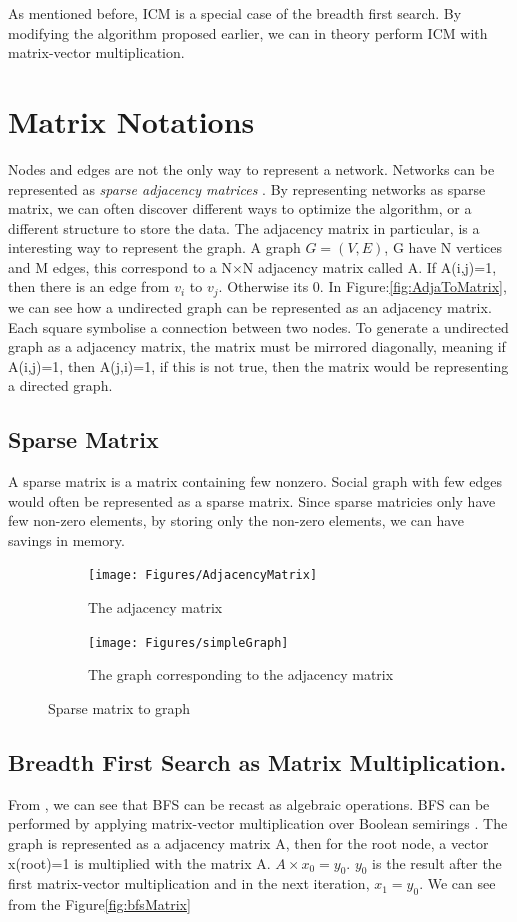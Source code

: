 As mentioned before, ICM is a special case of the breadth first search. By modifying the algorithm proposed earlier, we can in theory perform ICM with matrix-vector multiplication.  

\section{Matrix Notations}
Nodes and edges are not the only way to represent a network. Networks can be represented as \textit{sparse adjacency matrices} \cite{AlgoToMath} \cite{McAndrew1963}. By representing networks as sparse matrix, we can often discover different ways to optimize the algorithm, or a different structure to store the data. The adjacency matrix in particular, is a interesting way to represent the graph. A graph $G =(V,E)$, G have N vertices and M edges, this correspond to a N$\times$N adjacency matrix called A. If A(i,j)=1, then there is an edge from $v_i$ to $v_j$. Otherwise its 0. In Figure:\ref{fig:AdjaToMatrix}, we can see how a undirected graph can be represented as an adjacency matrix. Each square symbolise a connection between two nodes. To generate a undirected graph as a adjacency matrix, the matrix must be mirrored diagonally, meaning if A(i,j)=1, then A(j,i)=1, if this is not true, then the matrix would be representing a directed graph.

\subsection{Sparse Matrix}
A sparse matrix is a matrix containing few nonzero. Social graph with few edges would often be represented as a sparse matrix. Since sparse matricies only have few non-zero elements, by storing only the non-zero elements, we can have savings in memory.

\begin{figure}
	\begin{subfigure}{0.5\textwidth}
	\texttt{[image: Figures/AdjacencyMatrix]}
	\caption{The adjacency matrix}
	\label{fig:AdjacencyM}
	\end{subfigure}
	\begin{subfigure}{0.5\textwidth}
	\texttt{[image: Figures/simpleGraph]}
	\caption{The graph corresponding to the adjacency matrix}
	\label{fig:matrix}
	\end{subfigure}
 	\caption{Sparse matrix to graph}
 	\label{AdjaToMatrix}
\end{figure}

\subsection{Breadth First Search as Matrix Multiplication.} \label{BFS as Matrix}
From  \cite{AlgoToMath}, we can see that BFS can be recast as algebraic operations. BFS can be performed by applying matrix-vector multiplication over Boolean semirings \cite{HybridBFS2015}. The graph is represented as a adjacency matrix A, then for the root node, a vector x(root)=1 is multiplied with the matrix A. $A \times x_0 = y_0$. $y_0$ is the result after the first matrix-vector multiplication and in the next iteration, $x_1 = y_0$. We can see from the Figure\ref{fig:bfsMatrix}

